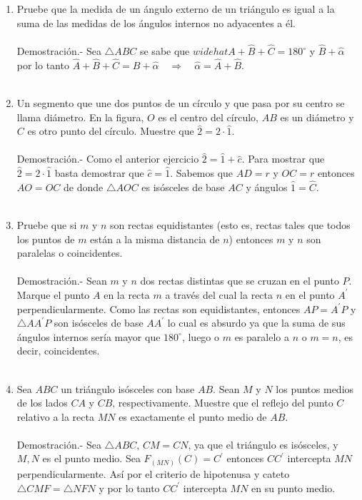 \documentclass[10pt]{article}
\begin{document}
\begin{enumerate}
\item Pruebe que la medida de un ángulo externo de un triángulo es igual a la suma de las medidas de los ángulos internos no adyacentes a él.\\\\
    Demostración.-\; Sea $\triangle ABC$ se sabe que $widehat{A}+\widehat{B}+\widehat{C}=180^{\circ}$ y $\widehat{B}+\widehat{\alpha}$ por lo tanto $\widehat{A}+\widehat{B}+\widehat{C}=\widehat{B}+\widehat{\alpha} \quad \Rightarrow \quad \widehat{\alpha}=\widehat{A}+\widehat{B}$.\\\\

\item Un segmento que une dos puntos de un círculo y que pasa por su centro se llama diámetro. En la figura, $O$ es el centro del círculo, $AB$ es un diámetro y $C$ es otro punto del círculo. Muestre que $\widehat{2} = 2 · \widehat{1}$.\\\\
    Demostración.-\; Como el anterior ejercicio $\widehat{2}=\widehat{1}+\widehat{c}$. Para mostrar que $\widehat{2}=2\cdot \widehat{1}$ basta demostrar que $\widehat{c}=\widehat{1}$. Sabemos que $AD=r$ y $OC=r$ entonces $AO=OC$ de donde $\triangle AOC$ es isósceles de base $AC$ y ángulos $\widehat{1}=\widehat{C}$.\\\\

\item Pruebe que si $m$ y $n$ son rectas equidistantes (esto es, rectas tales que todos los puntos de $m$ están a la misma distancia de $n$) entonces $m$ y $n$ son paralelas o coincidentes.\\\\
    Demostración.-\; Sean $m$ y $n$ dos rectas distintas que se cruzan en el punto $P$. Marque el punto $A$ en la recta $m$ a través del cual la recta $n$ en el punto $A^{'}$ perpendicularmente. Como las rectas son equidistantes, entonces $AP = A^{'}P$ y $\triangle AA^{'}P$ son isósceles de base $AA^{'}$ lo cual es absurdo ya que la suma de sus ángulos internos sería mayor que $180^{\circ}$, luego o $m$ es paralelo a $n$ o $m=n$, es decir, coincidentes.\\\\

\item Sea $ABC$ un triángulo isósceles con base $AB$. Sean $M$ y $N$ los puntos medios de los lados $CA$ y $CB$, respectivamente. Muestre que el reflejo del punto $C$ relativo a la recta $MN$ es exactamente el punto medio de $AB$.\\\\
    Demostración.-\; Sea $\triangle ABC$, $CM=CN$, ya que el triángulo es isósceles, y $M,N$ es el punto medio. Sea $F_{(MN)}(C)=C^{'}$ entonces $CC^{'}$ intercepta $MN$ perpendicularmente. Así por el criterio de hipotenusa y cateto $\triangle CMF=\triangle NFN$ y por lo tanto $CC^{'}$ intercepta $MN$ en su punto medio.\\\\


\end{enumerate}
\end{document}
